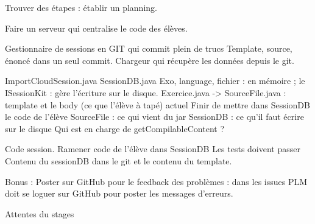 \documentclass[12pt,a4paper]{article}
\begin{document}
Trouver des étapes : établir un planning.

Faire un serveur qui centralise le code des élèves.

Gestionnaire de sessions en GIT qui commit plein de trucs
Template, source, énoncé dans un seul commit.
Chargeur qui récupère les données depuis le git.

ImportCloudSession.java
SessionDB.java Exo, language, fichier : en mémoire ; le ISessionKit : gère l'écriture sur le disque.
Exercice.java -> SourceFile.java : template et le body (ce que l'élève à tapé) actuel
Finir de mettre dans SessionDB le code de l'élève
SourceFile : ce qui vient du jar
SessionDB : ce qu'il faut écrire sur le disque
Qui est en charge de getCompilableContent ?


Code session.
Ramener code de l'élève dans SessionDB
Les tests doivent passer
Contenu du sessionDB dans le git et le contenu du template.

Bonus :
Poster sur GitHub pour le feedback des problèmes : dans les issues
PLM doit se loguer sur GitHub pour poster les messages d'erreurs.

Attentes du stages
\end{document}
